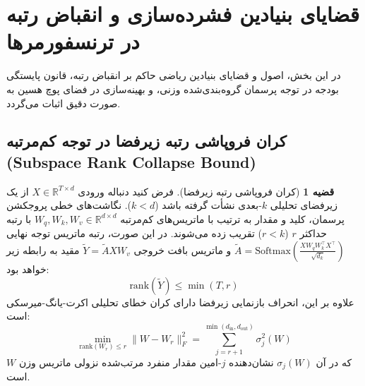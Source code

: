 \documentclass[12pt,a4paper]{report}
\theoremstyle{definition}
\newtheorem{theorem}{قضیه}[chapter]
\begin{document}
\section{قضایای بنیادین فشرده‌سازی و انقباض رتبه در ترنسفورمرها}
\label{sec:formal_theorems}
در این بخش، اصول و قضایای بنیادین ریاضی حاکم بر انقباض رتبه، قانون پایستگی بودجه در توجه پرسمان گروه‌بندی‌شده وزنی، و بهینه‌سازی در فضای پوچ هسین به صورت دقیق اثبات می‌گردد.

\subsection{کران فروپاشی رتبه زیرفضا در توجه کم‌مرتبه (Subspace Rank Collapse Bound)}
\begin{theorem}[کران فروپاشی رتبه زیرفضا]
\label{thm:subspace_collapse}
فرض کنید دنباله ورودی $X \in \mathbb{R}^{T \times d}$ از یک زیرفضای تحلیلی $k$-بعدی نشأت گرفته باشد ($k < d$). نگاشت‌های خطی پروجکشن پرسمان، کلید و مقدار به ترتیب با ماتریس‌های کم‌مرتبه $W_q, W_k, W_v \in \mathbb{R}^{d \times d}$ با رتبه حداکثر $r$ ($r < k$) تقریب زده می‌شوند. در این صورت، رتبه ماتریس توجه نهایی $\tilde{A} = \text{Softmax}\left(\frac{X W_q W_k^\top X^\top}{\sqrt{d_k}}\right)$ و ماتریس بافت خروجی $\tilde{Y} = \tilde{A} X W_v$ مقید به رابطه زیر خواهد بود:
\begin{equation}
\text{rank}(\tilde{Y}) \le \min(T, r)
\end{equation}
علاوه بر این، انحراف بازنمایی زیرفضا دارای کران خطای تحلیلی اکرت-یانگ-میرسکی است:
\begin{equation}
\min_{\text{rank}(W_r) \le r} \| W - W_r \|_F^2 = \sum_{j=r+1}^{\min(d_{\text{in}}, d_{\text{out}})} \sigma_j^2(W)
\end{equation}
که در آن $\sigma_j(W)$ نشان‌دهنده $j$-امین مقدار منفرد مرتب‌شده نزولی ماتریس وزن $W$ است.
\end{theorem}
\end{document}
